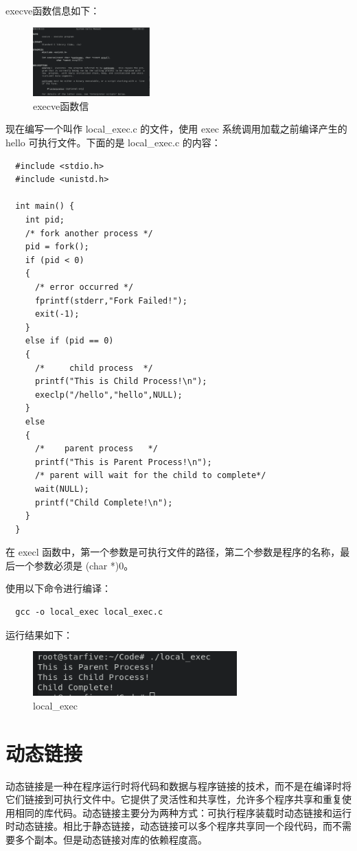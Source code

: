 \documentclass[lang=cn,10pt]{elegantbook}
\begin{document}
execve函数信息如下：
\begin{figure}[htbp]
  \centering
  \includegraphics[width=0.4\textwidth]{image/image-20231108204744069.png}
  \caption{execve函数信}
\end{figure}


现在编写一个叫作 local\_exec.c 的文件，使用 exec 系统调用加载之前编译产生的 hello 可执行文件。下面的是 local\_exec.c 的内容：

\begin{lstlisting}
  #include <stdio.h>
  #include <unistd.h>

  int main() {
    int pid;
    /* fork another process */
    pid = fork();
    if (pid < 0) 
    { 
      /* error occurred */
      fprintf(stderr,"Fork Failed!");
      exit(-1);
    } 
    else if (pid == 0) 
    {
      /*	 child process 	*/
      printf("This is Child Process!\n");
      execlp("/hello","hello",NULL);
    } 
    else 
    { 	
      /* 	parent process	 */
      printf("This is Parent Process!\n");
      /* parent will wait for the child to complete*/
      wait(NULL);
      printf("Child Complete!\n");
    }
  }
\end{lstlisting}
在 execl 函数中，第一个参数是可执行文件的路径，第二个参数是程序的名称，最后一个参数必须是 (char *)0。

使用以下命令进行编译：

\begin{lstlisting}
  gcc -o local_exec local_exec.c
\end{lstlisting}

运行结果如下：
\begin{figure}[htbp]
  \centering
  \includegraphics[width=0.7\textwidth]{image/image-20231109161948754.png}
  \caption{local\_exec}
\end{figure}


\section{动态链接}
动态链接是一种在程序运行时将代码和数据与程序链接的技术，而不是在编译时将它们链接到可执行文件中。它提供了灵活性和共享性，允许多个程序共享和重复使用相同的库代码。动态链接主要分为两种方式：可执行程序装载时动态链接和运行时动态链接。相比于静态链接，动态链接可以多个程序共享同一个段代码，而不需要多个副本。但是动态链接对库的依赖程度高。
\end{document}
